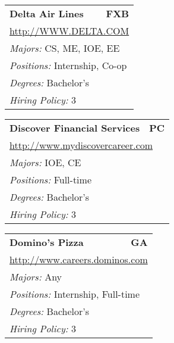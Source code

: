 \documentclass[twoside]{article}
\begin{document}
\begin{center}
\begin{multicols}{3}
\begin{FlushLeft}
\begin{minipage}{.9\columnwidth}
\end{minipage}
 
\begin{minipage}{.9\columnwidth}\begin{tabularx}{.95\columnwidth}{Xr}
                 {\Large\bf Delta Air Lines} & {\Large\bf FXB}\\
    \multicolumn{2}{p{.95\columnwidth}}{\url{http://WWW.DELTA.COM}}\\
    \multicolumn{2}{p{.95\columnwidth}}{\emph{Majors:} CS, ME, IOE, EE}\\
    \multicolumn{2}{p{.95\columnwidth}}{\emph{Positions:} Internship, Co-op}\\
    \multicolumn{2}{p{.95\columnwidth}}{\emph{Degrees:} Bachelor's}\\
    \multicolumn{2}{p{.95\columnwidth}}{\emph{Hiring Policy:} 3}\\
    \end{tabularx}
    
\end{minipage}
 
\begin{minipage}{.9\columnwidth}\begin{tabularx}{.95\columnwidth}{Xr}
                 {\Large\bf Discover Financial Services} & {\Large\bf PC}\\
    \multicolumn{2}{p{.95\columnwidth}}{\url{http://www.mydiscovercareer.com}}\\
    \multicolumn{2}{p{.95\columnwidth}}{\emph{Majors:} IOE, CE}\\
    \multicolumn{2}{p{.95\columnwidth}}{\emph{Positions:} Full-time}\\
    \multicolumn{2}{p{.95\columnwidth}}{\emph{Degrees:} Bachelor's}\\
    \multicolumn{2}{p{.95\columnwidth}}{\emph{Hiring Policy:} 3}\\
    \end{tabularx}
    
\end{minipage}
 
\begin{minipage}{.9\columnwidth}\begin{tabularx}{.95\columnwidth}{Xr}
                 {\Large\bf Domino's Pizza} & {\Large\bf GA}\\
    \multicolumn{2}{p{.95\columnwidth}}{\url{http://www.careers.dominos.com}}\\
    \multicolumn{2}{p{.95\columnwidth}}{\emph{Majors:} Any}\\
    \multicolumn{2}{p{.95\columnwidth}}{\emph{Positions:} Internship, Full-time}\\
    \multicolumn{2}{p{.95\columnwidth}}{\emph{Degrees:} Bachelor's}\\
    \multicolumn{2}{p{.95\columnwidth}}{\emph{Hiring Policy:} 3}\\
    \end{tabularx}
    

\end{minipage}
\end{FlushLeft}
\end{multicols}
\end{center}
\end{document}
